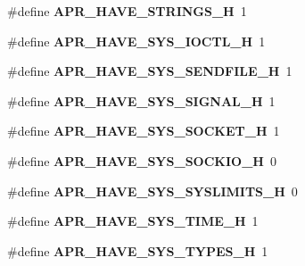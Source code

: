 \begin{DoxyCompactItemize}
\item 
\hypertarget{group__apr__platform_ga9c3381ac9d13a54181f0f0db44edb9da}{\#define {\bfseries A\-P\-R\-\_\-\-H\-A\-V\-E\-\_\-\-S\-T\-R\-I\-N\-G\-S\-\_\-\-H}~1}\label{group__apr__platform_ga9c3381ac9d13a54181f0f0db44edb9da}

\item 
\hypertarget{group__apr__platform_gaa770dc014bd3652af53e0b5007bacbba}{\#define {\bfseries A\-P\-R\-\_\-\-H\-A\-V\-E\-\_\-\-S\-Y\-S\-\_\-\-I\-O\-C\-T\-L\-\_\-\-H}~1}\label{group__apr__platform_gaa770dc014bd3652af53e0b5007bacbba}

\item 
\hypertarget{group__apr__platform_gadad28590d1ed5f6417d364da8d224c32}{\#define {\bfseries A\-P\-R\-\_\-\-H\-A\-V\-E\-\_\-\-S\-Y\-S\-\_\-\-S\-E\-N\-D\-F\-I\-L\-E\-\_\-\-H}~1}\label{group__apr__platform_gadad28590d1ed5f6417d364da8d224c32}

\item 
\hypertarget{group__apr__platform_ga8fcdcf3453badd12e7690ef1d3633524}{\#define {\bfseries A\-P\-R\-\_\-\-H\-A\-V\-E\-\_\-\-S\-Y\-S\-\_\-\-S\-I\-G\-N\-A\-L\-\_\-\-H}~1}\label{group__apr__platform_ga8fcdcf3453badd12e7690ef1d3633524}

\item 
\hypertarget{group__apr__platform_ga355cce8fb6a675d1608a249e80943cd1}{\#define {\bfseries A\-P\-R\-\_\-\-H\-A\-V\-E\-\_\-\-S\-Y\-S\-\_\-\-S\-O\-C\-K\-E\-T\-\_\-\-H}~1}\label{group__apr__platform_ga355cce8fb6a675d1608a249e80943cd1}

\item 
\hypertarget{group__apr__platform_ga66930e9c37ff249fac4f04660e0b4658}{\#define {\bfseries A\-P\-R\-\_\-\-H\-A\-V\-E\-\_\-\-S\-Y\-S\-\_\-\-S\-O\-C\-K\-I\-O\-\_\-\-H}~0}\label{group__apr__platform_ga66930e9c37ff249fac4f04660e0b4658}

\item 
\hypertarget{group__apr__platform_ga5f63518e601ff8db2435aac44aa1f5f1}{\#define {\bfseries A\-P\-R\-\_\-\-H\-A\-V\-E\-\_\-\-S\-Y\-S\-\_\-\-S\-Y\-S\-L\-I\-M\-I\-T\-S\-\_\-\-H}~0}\label{group__apr__platform_ga5f63518e601ff8db2435aac44aa1f5f1}

\item 
\hypertarget{group__apr__platform_ga9c3c283b26dc4a611e0e90586940d988}{\#define {\bfseries A\-P\-R\-\_\-\-H\-A\-V\-E\-\_\-\-S\-Y\-S\-\_\-\-T\-I\-M\-E\-\_\-\-H}~1}\label{group__apr__platform_ga9c3c283b26dc4a611e0e90586940d988}

\item 
\hypertarget{group__apr__platform_gad364bcfd0d4403388881ae74f30ae870}{\#define {\bfseries A\-P\-R\-\_\-\-H\-A\-V\-E\-\_\-\-S\-Y\-S\-\_\-\-T\-Y\-P\-E\-S\-\_\-\-H}~1}\label{group__apr__platform_gad364bcfd0d4403388881ae74f30ae870}


\end{DoxyCompactItemize}

